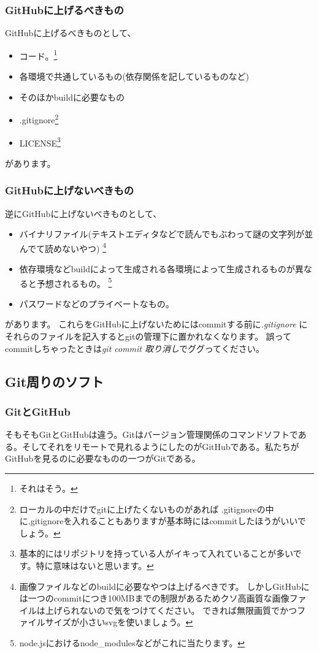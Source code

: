 \documentclass[dvipdfmx,jb5]{jreport}
\begin{document}
\subsubsection{GitHubに上げるべきもの}
GitHubに上げるべきものとして、
\begin{itemize}
      \item コード。\footnote{それはそう。}
      \item 各環境で共通しているもの(依存関係を記しているものなど)
      \item そのほかbuildに必要なもの
      \item .gitignore\footnote{ローカルの中だけでgitに上げたくないものがあれば
                  .gitignoreの中に.gitignoreを入れることもありますが基本時にはcommitしたほうがいいでしょう。
            }
      \item LICENSE\footnote{基本的にはリポジトリを持っている人がイキって入れていることが多いです。特に意味はないと思います。}
\end{itemize}
があります。
\subsubsection{GitHubに上げないべきもの}
逆にGitHubに上げないべきものとして、
\begin{itemize}
      \item バイナリファイル(テキストエディタなどで読んでもぶわって謎の文字列が並んでて読めないやつ)
            \footnote{画像ファイルなどのbuildに必要なやつは上げるべきです。
                  しかしGitHubには一つのcommitにつき100MBまでの制限があるためクソ高画質な画像ファイルは上げられないので気をつけてください。
                  できれば無限画質でかつファイルサイズが小さいsvgを使いましょう。
            }
      \item 依存環境などbuildによって生成される各環境によって生成されるものが異なると予想されるもの。
            \footnote{node.jsにおけるnode\_modulesなどがこれに当たります。}
      \item パスワードなどのプライベートなもの。
\end{itemize}
があります。
これらをGitHubに上げないためにはcommitする前に\emph{.gitignore}
にそれらのファイルを記入するとgitの管理下に置かれなくなります。
誤ってcommitしちゃったときは\emph{git commit 取り消し}でググってください。\subsection{Git周りのソフト}
\subsubsection{GitとGitHub}
そもそもGitとGitHubは違う。Gitはバージョン管理関係のコマンドソフトである。そしてそれをリモートで見れるようにしたのがGitHubである。私たちがGitHubを見るのに必要なものの一つがGitである。
\end{document}
